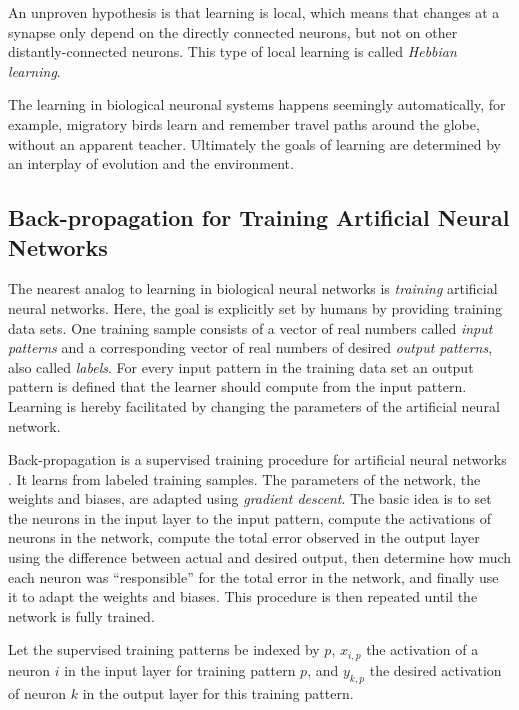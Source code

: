 An unproven hypothesis is that learning is local,
which means that changes at a synapse only depend on the directly
connected neurons, but not on other distantly-connected neurons. This
type of local learning is called \emph{Hebbian learning}.

The learning in biological neuronal systems happens seemingly automatically,
for example, migratory birds learn and remember travel paths around
the globe, without an apparent teacher. Ultimately the goals of learning
are determined by an interplay of evolution and the environment. 

\subsection{Back-propagation for Training Artificial Neural Networks\label{subsec:Back-propagation}}

The nearest analog to learning in biological neural networks is \emph{training
}artificial neural networks.
Here, the goal is explicitly set by humans by providing training data
sets. One training sample consists of a vector of real numbers called
\emph{input patterns} and a corresponding vector
of real numbers of desired \emph{output patterns},
also called \emph{labels}. For every input pattern in
the training data set an output pattern is defined that the learner
should compute from the input pattern. Learning is hereby facilitated
by changing the parameters of the artificial neural network.

Back-propagation is a supervised training procedure for artificial
neural networks \cite{RumelhartWilliams1988}. It learns from labeled
training samples. The parameters of the network, the weights and biases,
are adapted using \emph{gradient descent}.
The basic idea is to set the neurons in the input layer to the input
pattern, compute the activations of neurons in the network, compute
the total error observed in the output layer using the difference
between actual and desired output, then determine how much each neuron
was ``responsible'' for the total error in the network, and finally
use it to adapt the weights and biases. This procedure is then repeated
until the network is fully trained.

Let the supervised training patterns be indexed by $p$, $x_{i,p}$
the activation of a neuron $i$ in the input layer for training pattern
$p$, and $y_{k,p}$ the desired activation of neuron $k$ in the
output layer for this training pattern.

